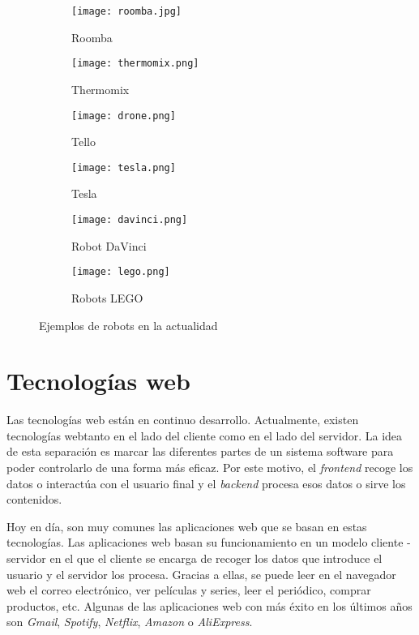 \begin{figure}[!h]
  \begin{subfigure}[b]{0.3\textwidth}
    \texttt{[image: roomba.jpg]}
    \caption{Roomba}
  \end{subfigure}
    \hfill
  \begin{subfigure}[b]{0.3\textwidth}
    \texttt{[image: thermomix.png]}
    \caption{Thermomix}
  \end{subfigure}
      \hfill
  \begin{subfigure}[b]{0.3\textwidth}
    \texttt{[image: drone.png]}
    \caption{Tello}
  \end{subfigure}
      \hfill
  \begin{subfigure}[b]{0.3\textwidth}
    \texttt{[image: tesla.png]}
    \caption{Tesla}
  \end{subfigure}
        \hfill
  \begin{subfigure}[b]{0.3\textwidth}
    \texttt{[image: davinci.png]}
    \caption{Robot DaVinci}
  \end{subfigure}
        \hfill
  \begin{subfigure}[b]{0.3\textwidth}
    \texttt{[image: lego.png]}
    \caption{Robots LEGO}
  \end{subfigure}
\caption{Ejemplos de robots en la actualidad}
\label{fig:EjemplosRobots}
\end{figure}


\section{Tecnologías web}
Las tecnologías web están en continuo desarrollo. Actualmente, existen tecnologías webtanto en el lado del cliente como en el lado del servidor. La idea de esta separación es marcar las diferentes partes de un sistema software para poder controlarlo de una forma más eficaz. Por este motivo, el \textit{frontend} recoge los datos o interactúa con el usuario final y el \textit{backend} procesa esos datos o sirve los contenidos. \newline

Hoy en día, son muy comunes las aplicaciones web que se basan en estas tecnologías. Las aplicaciones web basan su funcionamiento en un modelo cliente - servidor en el que el cliente se encarga de recoger los datos que introduce el usuario y el servidor los procesa. Gracias a ellas, se puede leer en el navegador web el correo electrónico, ver películas y series, leer el periódico, comprar productos, etc. Algunas de las aplicaciones web con más éxito en los últimos años son \textit{Gmail}, \textit{Spotify}, \textit{Netflix}, \textit{Amazon} o \textit{AliExpress}.

